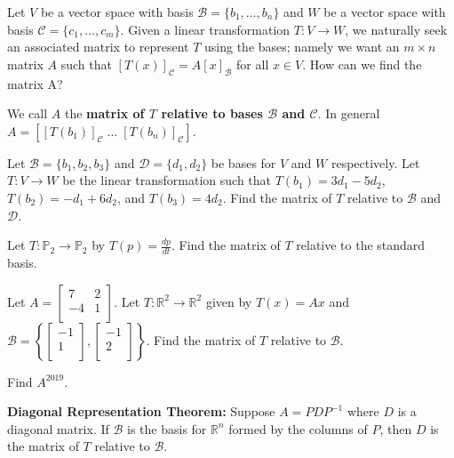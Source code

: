 \begin{enumerate}



\Problem Let $V$ be a vector space with basis $\mathcal{B}=\{b_1, \dots, b_n\}$ and $W$ be a vector space with basis $\mathcal{C}=\{c_1, \dots, c_m\}$. Given a linear transformation $T: V\to W$, we naturally seek an associated matrix to represent $T$ using the bases; namely we want an $m\times n$ matrix $A$ such that $[T(x)]_\mathcal{C}=A [x]_\mathcal{B}$ for all $x \in V$. How can we find the matrix A?

\newpage

We call $A$ the {\bf matrix of $T$ relative to bases $\mathcal{B}$ and $\mathcal{C}$}. In general $A= [[T(b_1)]_\mathcal{C} \; \dots \; [T(b_n)]_\mathcal{C}]$.

\Problem Let $\mathcal{B}=\{b_1, b_2, b_3\}$ and $\mathcal{D}=\{d_1, d_2\}$ be bases for $V$ and $W$ respectively. Let $T: V \to W$ be the linear transformation such that $T(b_1)=3d_1-5d_2$, $T(b_2)=-d_1+6d_2$, and $T(b_3)=4d_2$. Find the matrix of $T$ relative to $\mathcal{B}$ and $\mathcal{D}$.

\vfill

\Problem Let $T: \mathbb{P}_2 \to \mathbb{P}_2$ by $T(p)=\frac{dp}{dt}$. Find the matrix of $T$ relative to the standard basis.

\vfill

\newpage


\Problem Let $A=\begin{bmatrix} 7 & 2\\ -4 & 1\\ \end{bmatrix}$. Let $T: \mathbb{R}^2 \to \mathbb{R}^2$ given by $T(x)=Ax$ and $\mathcal{B}=\left \{\begin{bmatrix} -1\\ 1\\ \end{bmatrix}, \begin{bmatrix} -1\\ 2\\ \end{bmatrix} \right\}.$
\Part Find the matrix of $T$ relative to $\mathcal{B}$.

\vfill

\Part Find $A^{2019}$.

\vfill 

{\bf Diagonal Representation Theorem:} Suppose $A= P D P^{-1}$ where $D$ is a diagonal matrix. If $\mathcal{B}$ is the basis for $\mathbb{R}^n$ formed by the columns of $P$, then $D$ is the matrix of $T$ relative to $\mathcal{B}$. 


\end{enumerate}
